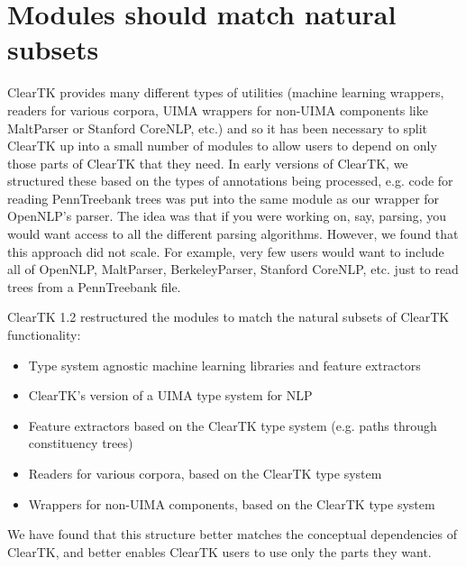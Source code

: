 \documentclass[10pt, a4paper]{article}
\begin{document}
\section{Modules should match natural subsets}
ClearTK provides many different types of utilities (machine learning wrappers, readers for various corpora, UIMA wrappers for non-UIMA components like MaltParser or Stanford CoreNLP, etc.) and so it has been necessary to split ClearTK up into a small number of modules to allow users to depend on only those parts of ClearTK that they need.
In early versions of ClearTK, we structured these based on the types of annotations being processed, e.g. code for reading PennTreebank trees was put into the same module as our wrapper for OpenNLP's parser.
The idea was that if you were working on, say, parsing, you would want access to all the different parsing algorithms.
However, we found that this approach did not scale.
For example, very few users would want to include all of OpenNLP, MaltParser, BerkeleyParser, Stanford CoreNLP, etc. just to read trees from a PennTreebank file.

ClearTK 1.2 restructured the modules to match the natural subsets of ClearTK functionality:
\begin{itemize}
\item Type system agnostic machine learning libraries and feature extractors 
\item ClearTK's version of a UIMA type system for NLP
\item Feature extractors based on the ClearTK type system (e.g. paths through constituency trees)
\item Readers for various corpora, based on the ClearTK type system
\item Wrappers for non-UIMA components, based on the ClearTK type system
\end{itemize}
We have found that this structure better matches the conceptual dependencies of ClearTK, and better enables ClearTK users to use only the parts they want.
\end{document}

